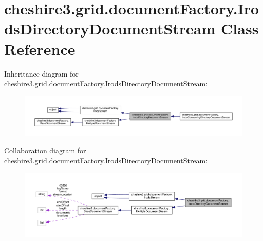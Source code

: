 \hypertarget{classcheshire3_1_1grid_1_1document_factory_1_1_irods_directory_document_stream}{\section{cheshire3.\-grid.\-document\-Factory.\-Irods\-Directory\-Document\-Stream Class Reference}
\label{classcheshire3_1_1grid_1_1document_factory_1_1_irods_directory_document_stream}
}


Inheritance diagram for cheshire3.\-grid.\-document\-Factory.\-Irods\-Directory\-Document\-Stream\-:
\nopagebreak
\begin{figure}[H]
\begin{center}
\leavevmode
\includegraphics[width=350pt]{classcheshire3_1_1grid_1_1document_factory_1_1_irods_directory_document_stream__inherit__graph}
\end{center}
\end{figure}


Collaboration diagram for cheshire3.\-grid.\-document\-Factory.\-Irods\-Directory\-Document\-Stream\-:
\nopagebreak
\begin{figure}[H]
\begin{center}
\leavevmode
\includegraphics[width=350pt]{classcheshire3_1_1grid_1_1document_factory_1_1_irods_directory_document_stream__coll__graph}
\end{center}
\end{figure}
